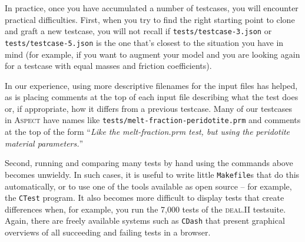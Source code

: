 \documentclass{article}
\newcommand{\dealii}{{\textsc{deal.II}}}
\newcommand{\aspect}{\textsc{Aspect}}
\begin{document}
In practice, once you have accumulated a number of testcases, you will
encounter practical difficulties. First, when you try to find the right
starting point to clone and graft a new testcase, you will not recall if
\texttt{tests/testcase-3.json} or \texttt{tests/testcase-5.json} is the one
that's closest to the situation you have in mind (for example, if you want to
augment your model and you are looking again for a testcase with equal masses
and friction coefficients). 

In our experience, using more descriptive filenames for the input files has
helped, as is placing comments at the top of each input file describing what
the test does or, if appropriate, how it differs from a previous
testcase. Many of our testcases in \aspect{} have names like
\texttt{tests/melt-fraction-peridotite.prm} and comments at the top of the
form ``\textit{Like the melt-fraction.prm test, but using the peridotite
  material parameters.}''

Second, running and comparing many tests by hand using the commands above
becomes unwieldy. In such cases, it is useful to write little
\texttt{Makefile}s that do this automatically, or to use one of the tools
available as open source -- for example, the \texttt{CTest} program. It also
becomes more difficult to display tests that create differences when, for
example, you run the 7,000 tests of the \dealii{} testsuite. Again, there are
freely available systems such as \texttt{CDash} that present graphical
overviews of all succeeding and failing tests in a browser.
\end{document}
